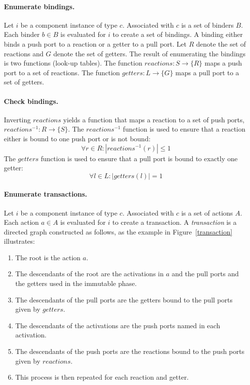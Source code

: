 \paragraph{Enumerate bindings.}
Let $i$ be a component instance of type $c$.
Associated with $c$ is a set of binders $B$.
Each binder $b \in B$ is evaluated for $i$ to create a set of bindings.
A binding either binds a push port to a reaction or a getter to a pull port.
Let $R$ denote the set of reactions and $G$ denote the set of getters.
The result of enumerating the bindings is two functions (look-up tables).
The function $\mathit{reactions}: S \to \{ R \}$ maps a push port to a set of reactions.
The function $\mathit{getters}: L \to \{ G \}$ maps a pull port to a set of getters.

\paragraph{Check bindings.}
Inverting $\mathit{reactions}$ yields a function that maps a reaction to a set of push ports, $\mathit{reactions}^{-1}: R \to \{ S \}$.
The $\mathit{reactions}^{-1}$ function is used to ensure that a reaction either is bound to one push port or is not bound:
\begin{equation}
\forall r \in R : |\mathit{reactions}^{-1} (r)| \leq 1
\end{equation}
The $\mathit{getters}$ function is used to ensure that a pull port is bound to exactly one getter:
\begin{equation}
\forall l \in L : |\mathit{getters} (l)| = 1
\end{equation}

\paragraph{Enumerate transactions.}
Let $i$ be a component instance of type $c$.
Associated with $c$ is a set of actions $A$.
Each action $a \in A$ is evaluated for $i$ to create a transaction.
A \emph{transaction} is a directed graph constructed as follows, as the example in Figure~\ref{transaction} illustrates:
\begin{enumerate}
\item The root is the action $a$.
\item The descendants of the root are the activations in $a$ and the pull ports and the getters used in the immutable phase.
\item The descendants of the pull ports are the getters bound to the pull ports given by $\mathit{getters}$.
\item The descendants of the activations are the push ports named in each activation.
\item The descendants of the push ports are the reactions bound to the push ports given by $\mathit{reactions}$.
\item This process is then repeated for each reaction and getter.
\end{enumerate}

